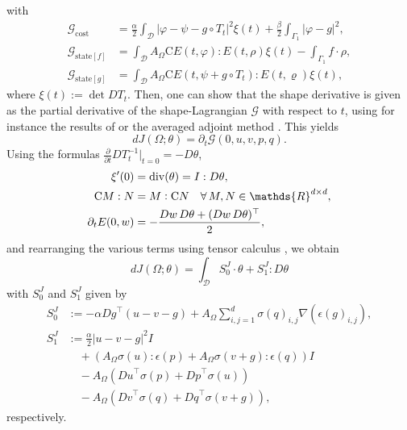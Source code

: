 \documentclass[iicol,pdflatex,sn-mathphys-ay]{sn-jnl}%
\theoremstyle{thmstyleone}%
\theoremstyle{thmstyletwo}%
\theoremstyle{thmstylethree}%
\begin{document}
with
\begin{align*}
	\mathcal{G}_{\mathrm{cost}}     &= \frac{\alpha}{2}\int_{\mathcal{D}}\left|\varphi-\psi-g\circ T_{t}\right|^{2}\xi(t)+\frac{\beta}{2}\int_{\Gamma_{1}}\left|\varphi-g\right|^{2}, \\
	\mathcal{G}_{\mathrm{state}[f]} &= \int_{\mathcal{D}}A_{\Omega}\mathrm{C}E(t,\varphi):E(t,\rho)\xi(t)-\int_{\Gamma_{1}}f\cdot\rho, \\
	\mathcal{G}_{\mathrm{state}[g]} &= \int_{\mathcal{D}}A_{\Omega}\mathrm{C}E(t,\psi + g\circ T_{t}):E(t,\varrho)\xi(t),
\end{align*}
where $\xi(t):=\det DT_t$.
Then, one can show that the shape derivative is given as
the partial derivative of the shape-Lagrangian $\mathcal{G}$
with respect to $t$, using for instance the results of
\cite[Chapter~10, Section~5.4]{MR2731611} or
the averaged adjoint method \cite{MR3535238}.
This yields
\begin{equation}
	dJ(\Omega; \theta) = \partial_{t}\mathcal{G}(0, u, v, p, q).
\end{equation}
Using the formulas $\frac{\partial}{\partial t} DT_{t}^{-1}|_{t=0} =-D\theta$,   
\[
\begin{aligned}
	\xi'(0) & = \operatorname{div}(\theta) = I : D\theta,\\
	\mathrm{C}M:N &= M\vcentcolon\mathrm{C}N \quad \forall\,M,N\in\mathds{R}^{d\times d},\\
	\partial_t E(0,w) &= -\frac{Dw\,D\theta + (Dw\,D\theta)^\top}{2},
\end{aligned}
\]
and rearranging the various terms using tensor calculus \cite[Lemma 2.2]{MR4531392}, we obtain
\begin{equation}\label{eq:SDelast_inv}
	dJ(\Omega; \theta) = \int_{\mathcal{D}} S_0^J \cdot \theta + S_1^J : D\theta 
\end{equation}
with $S_0^J$ and $S_1^J$ given by
\[
\begin{aligned}
	S^{J}_{0} & := -\alpha{Dg}^{\top}(u - v - g) +
	A_{\Omega}\sum_{i,j=1}^{d}{\sigma (q)}_{i,j}\nabla(\epsilon(g)_{i,j}),\\
	S^{J}_{1} & := \frac{\alpha}{2}{|u-v-g|}^2 I\\
			  & \quad + \left(A_{\Omega}\sigma(u):\epsilon(p) + A_{\Omega}\sigma(v+g):\epsilon(q)\right)I\\
			  & \quad - A_{\Omega} \left({Du}^{\top}\sigma(p) + {Dp}^{\top}\sigma(u)\right)\\
			  & \quad - A_{\Omega} \left({Dv}^{\top}\sigma(q) + {Dq}^{\top}\sigma(v+g)\right),
\end{aligned}
\]
respectively.
\end{document}
